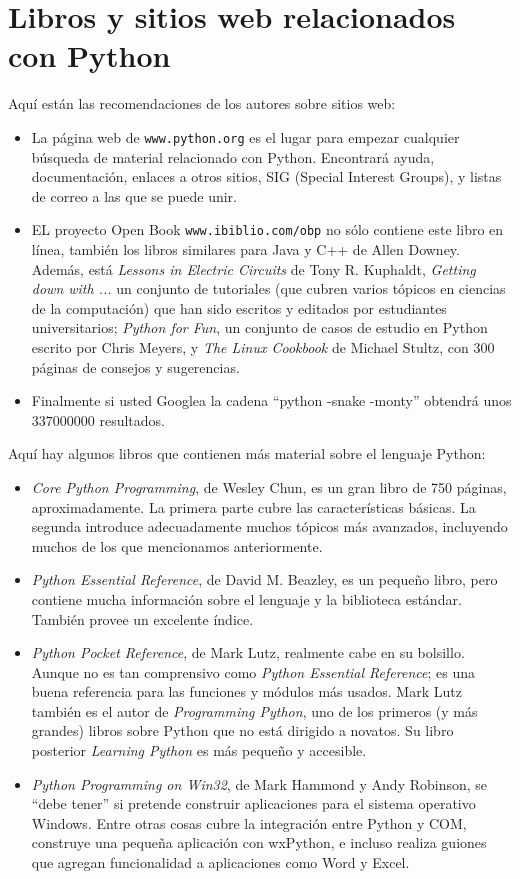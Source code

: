 \section{Libros y sitios web relacionados con Python}

Aquí están las recomendaciones de los autores sobre sitios web:
\begin{itemize}
\item La página web de \texttt{www.python.org} es el lugar para empezar
cualquier búsqueda de material relacionado con Python. Encontrará
ayuda, documentación, enlaces a otros sitios, SIG (Special Interest
Groups), y listas de correo a las que se puede unir.
\item EL proyecto Open Book \texttt{www.ibiblio.com/obp} no sólo contiene
este libro en línea, también los libros similares para Java y C++
de Allen Downey. Además, está {\em Lessons in Electric Circuits}
de Tony R. Kuphaldt, {\em Getting down with ...} un conjunto de
tutoriales (que cubren varios tópicos en ciencias de la computación)
que han sido escritos y editados por estudiantes universitarios; {\em
Python for Fun}, un conjunto de casos de estudio en Python escrito
por Chris Meyers, y {\em The Linux Cookbook} de Michael Stultz,
con 300 páginas de consejos y sugerencias.
\item Finalmente si usted Googlea la cadena ``python -snake -monty'' obtendrá
unos $337000000$ resultados.
\end{itemize}

Aquí hay algunos libros que contienen más material sobre el lenguaje
Python:
\begin{itemize}
\item {\em Core Python Programming}, de Wesley Chun, es un gran libro
de 750 páginas, aproximadamente. La primera parte cubre las características
básicas. La segunda introduce adecuadamente muchos tópicos más avanzados,
incluyendo muchos de los que mencionamos anteriormente.
\item {\em Python Essential Reference}, de David M. Beazley, es un pequeño
libro, pero contiene mucha información sobre el lenguaje y la biblioteca
estándar. También provee un excelente índice.
\item {\em Python Pocket Reference}, de Mark Lutz, realmente cabe en
su bolsillo. Aunque no es tan comprensivo como {\em Python Essential
Reference}; es una buena referencia para las funciones y módulos
más usados. Mark Lutz también es el autor de {\em Programming Python},
uno de los primeros (y más grandes) libros sobre Python que no está
dirigido a novatos. Su libro posterior {\em Learning Python} es
más pequeño y accesible.
\item {\em Python Programming on Win32}, de Mark Hammond y Andy Robinson,
se ``debe tener'' si pretende construir aplicaciones para el sistema
operativo Windows. Entre otras cosas cubre la integración entre Python
y COM, construye una pequeña aplicación con wxPython, e incluso realiza
guiones que agregan funcionalidad a aplicaciones como Word y Excel.
\end{itemize}

